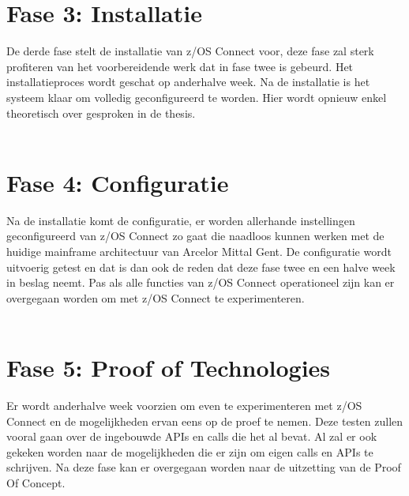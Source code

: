 \section{Fase 3: Installatie}
\label{sec:Fase 3: Installatie}
De derde fase stelt de installatie van z/OS Connect voor, deze fase zal sterk profiteren van het voorbereidende werk dat in fase twee is gebeurd. Het installatieproces wordt geschat op anderhalve week. Na de installatie is het systeem klaar om volledig geconfigureerd te worden. Hier wordt opnieuw enkel theoretisch over gesproken in de thesis.
\\ \\
\section{Fase 4: Configuratie}
\label{sec:Fase 4: Configuratie}
Na de installatie komt de configuratie, er worden allerhande instellingen geconfigureerd van z/OS Connect zo gaat die naadloos kunnen werken met de huidige mainframe architectuur van Arcelor Mittal Gent. De configuratie wordt uitvoerig getest en dat is dan ook de reden dat deze fase twee en een halve week in beslag neemt. Pas als alle functies van z/OS Connect operationeel zijn kan er overgegaan worden om met z/OS Connect te experimenteren.
\\ \\
\section{Fase 5: Proof of Technologies}
\label{sec:Fase 5: Proof of Technologies}
Er wordt anderhalve week voorzien om even te experimenteren met z/OS Connect en de mogelijkheden ervan eens op de proef te nemen. Deze testen zullen vooral gaan over de ingebouwde APIs en calls die het al bevat. Al zal er ook gekeken worden naar de mogelijkheden die er zijn om eigen calls en APIs te schrijven. Na deze fase kan er overgegaan worden naar de uitzetting van de Proof Of Concept.
\\ \\
